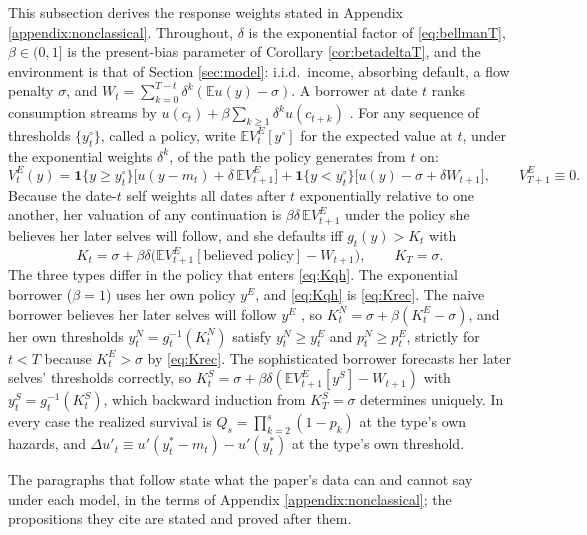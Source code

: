 \documentclass[12pt,english]{article}
\begin{document}
This subsection derives the response weights stated in Appendix \ref{appendix:nonclassical}. Throughout, $\delta$ is the exponential factor of \eqref{eq:bellmanT}, $\beta \in (0,1]$ is the present-bias parameter of Corollary \ref{cor:betadeltaT}, and the environment is that of Section \ref{sec:model}: i.i.d.\ income, absorbing default, a flow penalty $\sigma$, and $W_t = \sum_{k=0}^{T-t}\delta^k(\mathbb{E}u(y) - \sigma)$. A borrower at date $t$ ranks consumption streams by $u(c_t) + \beta\sum_{k \ge 1}\delta^k u(c_{t+k})$ \citep{laibson_golden_1997}. For any sequence of thresholds $\{y_t^\circ\}$, called a policy, write $\mathbb{E}V^E_t[y^\circ]$ for the expected value at $t$, under the exponential weights $\delta^k$, of the path the policy generates from $t$ on:
\[
V^E_t(y) = \mathbf{1}\{y \ge y_t^\circ\}\big[u(y - m_t) + \delta\,\mathbb{E}V^E_{t+1}\big] + \mathbf{1}\{y < y_t^\circ\}\big[u(y) - \sigma + \delta W_{t+1}\big], \qquad V^E_{T+1} \equiv 0 .
\]
Because the date-$t$ self weights all dates after $t$ exponentially relative to one another, her valuation of any continuation is $\beta\delta\,\mathbb{E}V^E_{t+1}$ under the policy she believes her later selves will follow, and she defaults iff $g_t(y) > K_t$ with
\begin{equation}\label{eq:Kqh}
K_t = \sigma + \beta\delta\big(\mathbb{E}V^E_{t+1}[\text{believed policy}] - W_{t+1}\big), \qquad K_T = \sigma .
\end{equation}
The three types differ in the policy that enters \eqref{eq:Kqh}. The exponential borrower ($\beta = 1$) uses her own policy $y^E$, and \eqref{eq:Kqh} is \eqref{eq:Krec}. The naive borrower believes her later selves will follow $y^E$ \citep{odonoghue_doing_1999}, so $K^N_t = \sigma + \beta(K^E_t - \sigma)$, and her own thresholds $y^N_t = g_t^{-1}(K^N_t)$ satisfy $y^N_t \ge y^E_t$ and $p^N_t \ge p^E_t$, strictly for $t < T$ because $K^E_t > \sigma$ by \eqref{eq:Krec}. The sophisticated borrower forecasts her later selves' thresholds correctly, so $K^S_t = \sigma + \beta\delta(\mathbb{E}V^E_{t+1}[y^S] - W_{t+1})$ with $y^S_t = g_t^{-1}(K^S_t)$, which backward induction from $K^S_T = \sigma$ determines uniquely. In every case the realized survival is $Q_s = \prod_{k=2}^{s}(1 - p_k)$ at the type's own hazards, and $\Delta u'_t \equiv u'(y_t^* - m_t) - u'(y_t^*)$ at the type's own threshold.

The paragraphs that follow state what the paper's data can and cannot say under each model, in the terms of Appendix \ref{appendix:nonclassical}; the propositions they cite are stated and proved after them.
\end{document}
